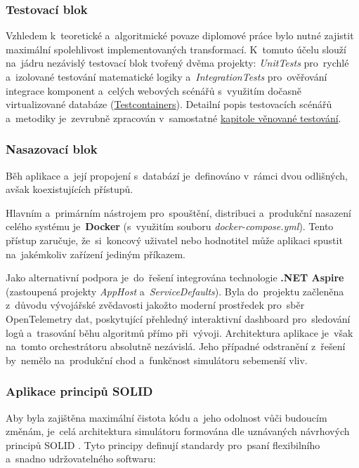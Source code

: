 \documentclass[
  master,
  program=ainfvs,
  printversion,
  figures=false,
  tables=false,
  glossaries,
  index
]{kidiplom}
\begin{document}
\subsubsection{Testovací blok}
Vzhledem k~teoretické a~algoritmické povaze diplomové práce bylo nutné zajistit maximální spolehlivost implementovaných transformací. K~tomuto účelu slouží na~jádru nezávislý testovací blok tvořený dvěma projekty: \textit{UnitTests} pro~rychlé a~izolované testování matematické logiky a~\textit{IntegrationTests} pro~ověřování integrace komponent a~celých webových scénářů s~využitím dočasně virtualizované databáze (\hyperref[par:testcontainers]{Testcontainers}). Detailní popis testovacích scénářů a~metodiky je~zevrubně zpracován v~samostatné \hyperref[sec:testovani]{kapitole věnované testování}.

\subsubsection{Nasazovací blok}
Běh aplikace a~její propojení s~databází je~definováno v~rámci dvou odlišných, avšak koexistujících přístupů. 

Hlavním a~primárním nástrojem pro~spouštění, distribuci a~produkční nasazení celého systému je~\textbf{Docker} (s~využitím souboru \textit{docker-compose.yml}). Tento přístup zaručuje, že~si~koncový uživatel nebo hodnotitel může aplikaci spustit na~jakémkoliv zařízení jediným příkazem.

Jako alternativní podpora je~do~řešení integrována technologie \textbf{.NET Aspire} (zastoupená projekty \textit{AppHost} a~\textit{ServiceDefaults}). Byla do~projektu začleněna z~důvodu vývojářské zvědavosti jakožto moderní prostředek pro~sběr OpenTelemetry dat, poskytující přehledný interaktivní dashboard pro~sledování logů a~trasování běhu algoritmů přímo při~vývoji. Architektura aplikace je~však na~tomto orchestrátoru absolutně nezávislá. Jeho případné odstranění z~řešení by~nemělo na~produkční chod a~funkčnost simulátoru sebemenší vliv.

\subsubsection{Aplikace principů SOLID}
Aby byla zajištěna maximální čistota kódu a~jeho odolnost vůči budoucím změnám, je~celá architektura simulátoru formována dle uznávaných návrhových principů SOLID \cite{king_solid_2014}. Tyto principy definují standardy pro~psaní flexibilního a~snadno udržovatelného softwaru:
\end{document}
